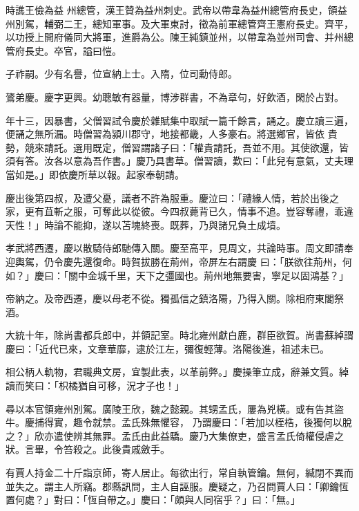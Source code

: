 \begin{pinyinscope}
 時譙王儉為益
 州總管，漢王贊為益州刺史。武帝以帶韋為益州總管府長史，領益州別駕，輔弼二王，總知軍事。及大軍東討，徵為前軍總管齊王憲府長史。齊平，以功授上開府儀同大將軍，進爵為公。陳王純鎮並州，以帶韋為並州司會、并州總管府長史。卒官，謚曰愷。



 子祚嗣。少有名譽，位宣納上士。入隋，位司勳侍郎。



 鷟弟慶。慶字更興。幼聰敏有器量，博涉群書，不為章句，好飲酒，閑於占對。



 年十三，因暴書，父僧習試令慶於雜賦集中取賦一篇千餘言，誦之。慶立讀三遍，便誦之無所漏。時僧習為潁川郡守，地接都畿，人多豪右。將選鄉官，皆依
 貴勢，競來請託。選用既定，僧習謂諸子曰：「權貴請託，吾並不用。其使欲還，皆須有答。汝各以意為吾作書。」慶乃具書草。僧習讀，歎曰：「此兒有意氣，丈夫理當如是。」即依慶所草以報。起家奉朝請。



 慶出後第四叔，及遭父憂，議者不許為服重。慶泣曰：「禮緣人情，若於出後之家，更有苴斬之服，可奪此以從彼。今四叔薨背已久，情事不追。豈容奪禮，乖違天性！」時論不能抑，遂以苫塊終喪。既葬，乃與諸兄負土成墳。



 孝武將西遷，慶以散騎侍郎馳傳入關。慶至高平，見周文，共論時事。周文即請奉迎輿駕，仍令慶先還復命。時賀拔勝在荊州，帝屏左右謂慶
 曰：「朕欲往荊州，何如？」慶曰：「關中金城千里，天下之彊國也。荊州地無要害，寧足以固鴻基？」



 帝納之。及帝西遷，慶以母老不從。獨孤信之鎮洛陽，乃得入關。除相府東閣祭酒。



 大統十年，除尚書都兵郎中，并領記室。時北雍州獻白鹿，群臣欲賀。尚書蘇綽謂慶曰：「近代已來，文章華靡，逮於江左，彌復輕薄。洛陽後進，祖述未已。



 相公柄人軌物，君職典文房，宜製此表，以革前弊。」慶操筆立成，辭兼文質。綽讀而笑曰：「枳橘猶自可移，況才子也！」



 尋以本官領雍州別駕。廣陵王欣，魏之懿親。其甥孟氏，屢為兇橫。或有告其盜牛。慶捕得實，趣令就禁。孟氏殊無懼容，
 乃謂慶曰：「若加以桎梏，後獨何以脫之？」欣亦遣使辨其無罪。孟氏由此益驕。慶乃大集僚吏，盛言孟氏倚權侵虐之狀。言畢，令笞殺之。此後貴戚斂手。



 有賈人持金二十斤詣京師，寄人居止。每欲出行，常自執管鑰。無何，緘閉不異而並失之。謂主人所竊。郡縣訊問，主人自誣服。慶疑之，乃召問賈人曰：「卿鑰恆置何處？」對曰：「恆自帶之。」慶曰：「頗與人同宿乎？」曰：「無。」




\end{pinyinscope}
